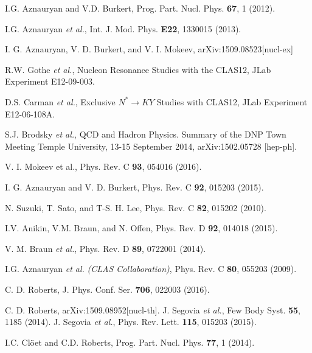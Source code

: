 \begin{thebibliography}{999}

 

I.G. Aznauryan and V.D. Burkert, Prog. Part. Nucl. Phys. {\bf 67}, 1 (2012).



I.G. Aznauryan {\it et al.}, Int. J. Mod. Phys. {\bf E22}, 1330015 (2013).



I. G. Aznauryan, V. D. Burkert, and V. I. Mokeev, arXiv:1509.08523[nucl-ex] 



R.W. Gothe {\it et al.}, Nucleon Resonance Studies with the CLAS12, JLab Experiment E12-09-003.



D.S. Carman {\it et al.}, Exclusive $N^* \to KY$ Studies with CLAS12, JLab Experiment E12-06-108A.



S.J. Brodsky {\it et al.}, QCD and Hadron Physics. Summary of the DNP Town Meeting Temple University, 
13-15 September 2014, arXiv:1502.05728 [hep-ph].

V. I. Mokeev et al., Phys. Rev. C {\bf 93}, 054016 (2016).

I. G. Aznauryan and V. D. Burkert, Phys. Rev. C {\bf 92}, 015203 (2015).

N. Suzuki, T. Sato, and T-S. H. Lee, Phys. Rev. C {\bf 82}, 015202 (2010).


I.V. Anikin, V.M. Braun, and N. Offen, Phys. Rev. D {\bf 92}, 014018 (2015).



V. M. Braun {\it et al.}, Phys. Rev. D {\bf 89}, 0722001 (2014).

I.G. Aznauryan {\it et al.} {\it (CLAS Collaboration)}, Phys. Rev. C {\bf 80}, 055203 (2009).



C. D. Roberts, J. Phys. Conf. Ser. {\bf 706}, 022003 (2016).



C. D. Roberts, arXiv:1509.08952[nucl-th].
J. Segovia {\it et al.}, Few Body Syst. {\bf 55}, 1185 (2014).
J. Segovia {\it et al.}, 
Phys. Rev. Lett. {\bf 115}, 015203 (2015).

I.C. Cl\"{o}et and C.D. Roberts, Prog. Part. Nucl. Phys. {\bf 77}, 1 (2014).



\end{thebibliography}
